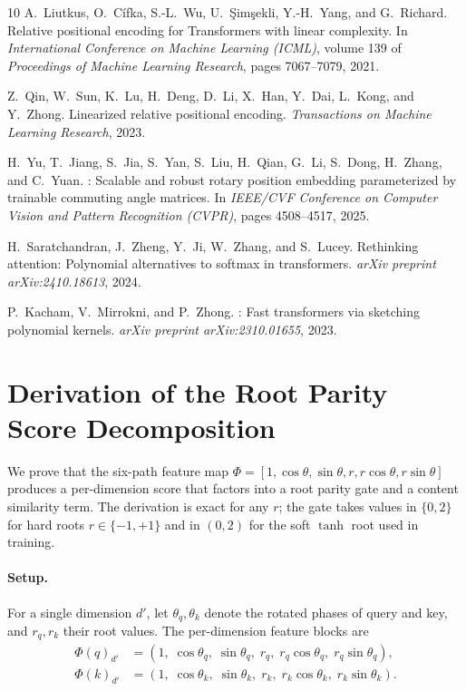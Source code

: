 \documentclass{article}
\begin{document}
\begin{thebibliography}{10}
A.~Liutkus, O.~C{\'i}fka, S.-L.~Wu, U.~{\c{S}}im{\c{s}}ekli, Y.-H.~Yang, and G.~Richard.
\newblock Relative positional encoding for {Transformers} with linear complexity.
\newblock In \emph{International Conference on Machine Learning (ICML)}, volume 139 of \emph{Proceedings of Machine Learning Research}, pages 7067--7079, 2021.

Z.~Qin, W.~Sun, K.~Lu, H.~Deng, D.~Li, X.~Han, Y.~Dai, L.~Kong, and Y.~Zhong.
\newblock Linearized relative positional encoding.
\newblock \emph{Transactions on Machine Learning Research}, 2023.

H.~Yu, T.~Jiang, S.~Jia, S.~Yan, S.~Liu, H.~Qian, G.~Li, S.~Dong, H.~Zhang, and C.~Yuan.
: Scalable and robust rotary position embedding parameterized by trainable commuting angle matrices.
\newblock In \emph{IEEE/CVF Conference on Computer Vision and Pattern Recognition (CVPR)}, pages 4508--4517, 2025.

H.~Saratchandran, J.~Zheng, Y.~Ji, W.~Zhang, and S.~Lucey.
\newblock Rethinking attention: Polynomial alternatives to softmax in transformers.
\newblock \emph{arXiv preprint arXiv:2410.18613}, 2024.

P.~Kacham, V.~Mirrokni, and P.~Zhong.
: Fast transformers via sketching polynomial kernels.
\newblock \emph{arXiv preprint arXiv:2310.01655}, 2023.

\end{thebibliography}

\appendix

\section{Derivation of the Root Parity Score Decomposition}
\label{app:derivation}

We prove that the six-path feature map $\Phi = [1, \cos\theta, \sin\theta, r, r\cos\theta, r\sin\theta]$ produces a per-dimension score that factors into a root parity gate and a content similarity term. The derivation is exact for any $r$; the gate takes values in $\{0,2\}$ for hard roots $r \in \{-1,+1\}$ and in $(0,2)$ for the soft $\tanh$ root used in training.

\paragraph{Setup.} For a single dimension $d'$, let $\theta_q, \theta_k$ denote the rotated phases of query and key, and $r_q, r_k$ their root values. The per-dimension feature blocks are
\begin{align}
\Phi(q)_{d'} &= (1,\; \cos\theta_q,\; \sin\theta_q,\; r_q,\; r_q\cos\theta_q,\; r_q\sin\theta_q), \\
\Phi(k)_{d'} &= (1,\; \cos\theta_k,\; \sin\theta_k,\; r_k,\; r_k\cos\theta_k,\; r_k\sin\theta_k).
\end{align}
\end{document}
